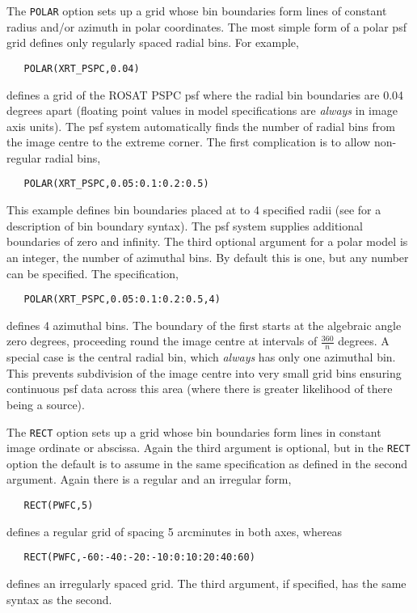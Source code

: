 The \verb+POLAR+ option sets up a grid whose bin boundaries form lines
of constant radius and/or azimuth in polar coordinates. The most simple
form of a polar psf grid defines only regularly spaced radial bins. For
example,
\begin{verbatim}
   POLAR(XRT_PSPC,0.04)
\end{verbatim}
defines a grid of the ROSAT PSPC psf where the radial bin boundaries
are 0.04 degrees apart
(floating point values in model specifications are {\em always} in
image axis units). The psf system automatically finds the number of
radial bins from the image centre to the extreme corner. The first
complication is to allow non-regular radial bins,
\begin{verbatim}
   POLAR(XRT_PSPC,0.05:0.1:0.2:0.5)
\end{verbatim}
This example defines bin boundaries placed at to 4 specified radii 
(see  for a description of
bin boundary syntax). The psf system supplies additional boundaries of 
zero and infinity. The third optional argument for a polar model is
an integer, the number of azimuthal bins. By default this is one, but
any number can be specified. The specification,
\begin{verbatim}
   POLAR(XRT_PSPC,0.05:0.1:0.2:0.5,4)
\end{verbatim}
defines 4 azimuthal bins. The boundary of the first starts at the
algebraic angle zero degrees, proceeding round the image centre at
intervals of $\frac{360}{n}$ degrees. A special case is the central
radial bin, which {\em always} has only one azimuthal bin. This
prevents subdivision of the image centre into very small grid bins
ensuring continuous psf data across this area (where there is greater
likelihood of there being a source).

The \verb+RECT+ option sets up a grid whose bin boundaries form lines
in constant image ordinate or abscissa. Again the third argument is optional,
but in the \verb+RECT+ option the default is to assume in the same
specification as defined in the second argument. Again there is a
regular and an irregular form,
\begin{verbatim}
   RECT(PWFC,5)
\end{verbatim}
defines a regular grid of spacing 5 arcminutes in both axes, whereas
\begin{verbatim}
   RECT(PWFC,-60:-40:-20:-10:0:10:20:40:60)
\end{verbatim} 
defines an irregularly spaced grid. The third argument, if specified,
has the same syntax as the second.

